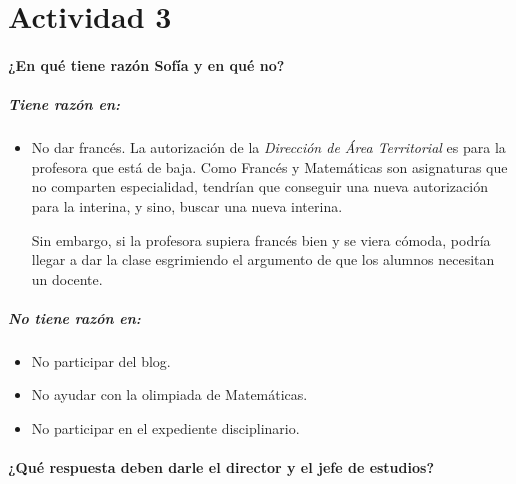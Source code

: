 \section{Actividad 3}


\paragraph{¿En qué tiene razón Sofía y en qué no?}

\subparagraph{Tiene razón en:}

\begin{itemize}
	\item No dar francés. La autorización de la \textit{Dirección de Área Territorial} es para la profesora que está de baja. 
	Como Francés y Matemáticas son asignaturas que no comparten especialidad, tendrían que conseguir una nueva autorización para la interina, y sino, buscar una nueva interina.

	Sin embargo, si la profesora supiera francés bien y se viera cómoda, podría llegar a dar la clase esgrimiendo el argumento de que los alumnos necesitan un docente.
\end{itemize}


\subparagraph{No tiene razón en:}

\begin{itemize}
	\item No participar del blog.
	\item No ayudar con la olimpiada de Matemáticas.
	\item No participar en el expediente disciplinario.
\end{itemize}


\paragraph{¿Qué respuesta deben darle el director y el jefe de estudios?}


